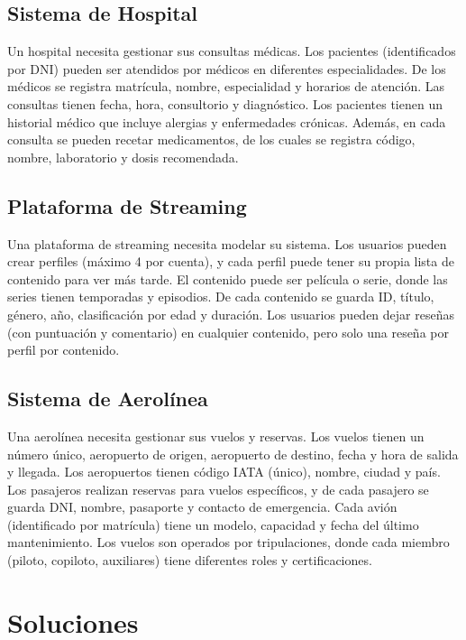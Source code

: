 \documentclass[12pt]{article}
\begin{document}
\subsection{Sistema de Hospital}
Un hospital necesita gestionar sus consultas médicas. Los pacientes (identificados por DNI) pueden ser atendidos por médicos en diferentes especialidades. De los médicos se registra matrícula, nombre, especialidad y horarios de atención. Las consultas tienen fecha, hora, consultorio y diagnóstico. Los pacientes tienen un historial médico que incluye alergias y enfermedades crónicas. Además, en cada consulta se pueden recetar medicamentos, de los cuales se registra código, nombre, laboratorio y dosis recomendada.

\subsection{Plataforma de Streaming}
Una plataforma de streaming necesita modelar su sistema. Los usuarios pueden crear perfiles (máximo 4 por cuenta), y cada perfil puede tener su propia lista de contenido para ver más tarde. El contenido puede ser película o serie, donde las series tienen temporadas y episodios. De cada contenido se guarda ID, título, género, año, clasificación por edad y duración. Los usuarios pueden dejar reseñas (con puntuación y comentario) en cualquier contenido, pero solo una reseña por perfil por contenido.

\subsection{Sistema de Aerolínea}
Una aerolínea necesita gestionar sus vuelos y reservas. Los vuelos tienen un número único, aeropuerto de origen, aeropuerto de destino, fecha y hora de salida y llegada. Los aeropuertos tienen código IATA (único), nombre, ciudad y país. Los pasajeros realizan reservas para vuelos específicos, y de cada pasajero se guarda DNI, nombre, pasaporte y contacto de emergencia. Cada avión (identificado por matrícula) tiene un modelo, capacidad y fecha del último mantenimiento. Los vuelos son operados por tripulaciones, donde cada miembro (piloto, copiloto, auxiliares) tiene diferentes roles y certificaciones.

\newpage
\section{Soluciones}
\end{document}
